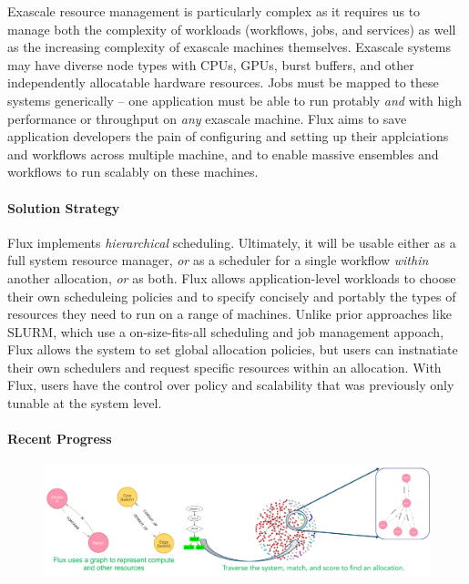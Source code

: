 Exascale resource management is particularly complex as it requires us to
manage both the complexity of workloads (workflows, jobs, and services)
as well as the increasing complexity of exascale machines themselves.
Exascale systems may have diverse node types with CPUs, GPUs, burst
buffers, and other independently allocatable hardware resources. Jobs
must be mapped to these systems generically -- one application must be
able to run protably {\it and} with high performance or throughput on
{\it any} exascale machine.  Flux aims to save application developers the
pain of configuring and setting up their applciations and workflows
across multiple machine, and to enable massive ensembles and workflows to
run scalably on these machines.

\paragraph{Solution Strategy}

Flux implements {\it hierarchical} scheduling.  Ultimately, it will be
usable either as a full system resource manager, {\it or} as a scheduler
for a single workflow {\it within} another allocation, {\it or} as both.
Flux allows application-level workloads to choose their own scheduleing
policies and to specify concisely and portably the types of resources
they need to run on a range of machines.  Unlike prior approaches like
SLURM, which use a on-size-fits-all scheduling and job management
appoach, Flux allows the system to set global allocation policies, but
users can instnatiate their own schedulers and request specific resources
within an allocation.  With Flux, users have the control over policy and
scalability that was previously only tunable at the system level.


\paragraph{Recent Progress}

\begin{figure}[tb]
\centering
\includegraphics[width=\textwidth]{projects/2.3.6-NNSA/2.3.6.02-LLNL-ATDM/flux-resource-model.pdf}
\end{figure}

